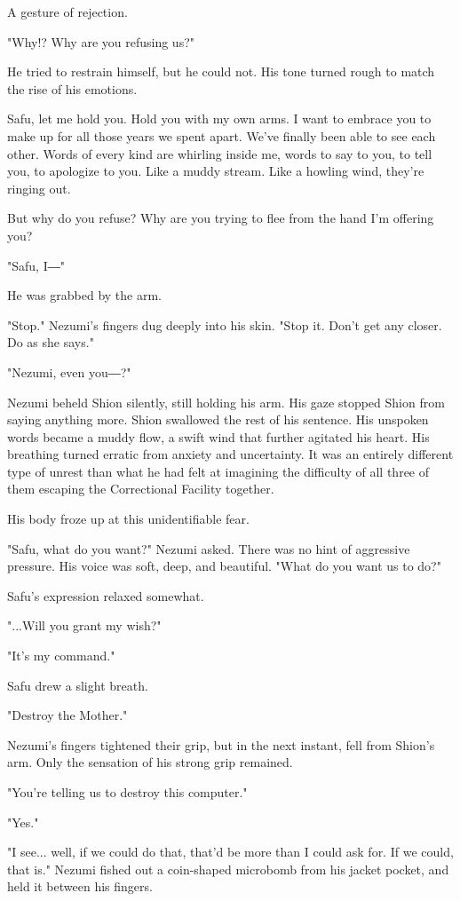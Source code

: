 A gesture of rejection.

"Why!? Why are you refusing us?"

He tried to restrain himself, but he could not. His tone turned rough to
match the rise of his emotions.

Safu, let me hold you. Hold you with my own arms. I want to embrace you
to make up for all those years we spent apart. We've finally been able
to see each other. Words of every kind are whirling inside me, words to
say to you, to tell you, to apologize to you. Like a muddy stream. Like
a howling wind, they're ringing out.

But why do you refuse? Why are you trying to flee from the hand I'm
offering you?

"Safu, I―"

He was grabbed by the arm.

"Stop." Nezumi's fingers dug deeply into his skin. "Stop it. Don't get
any closer. Do as she says."

"Nezumi, even you―?"

Nezumi beheld Shion silently, still holding his arm. His gaze stopped
Shion from saying anything more. Shion swallowed the rest of his
sentence. His unspoken words became a muddy flow, a swift wind that
further agitated his heart. His breathing turned erratic from anxiety
and uncertainty. It was an entirely different type of unrest than what
he had felt at imagining the difficulty of all three of them escaping
the Correctional Facility together.

His body froze up at this unidentifiable fear.

"Safu, what do you want?" Nezumi asked. There was no hint of aggressive
pressure. His voice was soft, deep, and beautiful. "What do you want us
to do?"

Safu's expression relaxed somewhat.

"...Will you grant my wish?"

"It's my command."

Safu drew a slight breath.

"Destroy the Mother."

Nezumi's fingers tightened their grip, but in the next instant, fell
from Shion's arm. Only the sensation of his strong grip remained.

"You're telling us to destroy this computer."

"Yes."

"I see... well, if we could do that, that'd be more than I could ask
for. If we could, that is." Nezumi fished out a coin-shaped microbomb
from his jacket pocket, and held it between his fingers.

